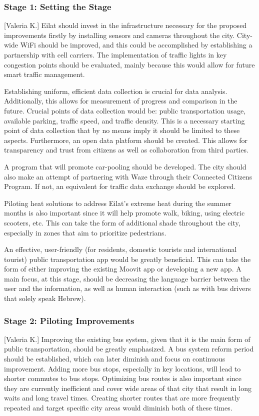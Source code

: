 \documentclass[12pt]{article}                               %
\begin{document}
\subsubsection{Stage 1: Setting the Stage}[Valeria K.]
Eilat should invest in the infrastructure necessary for the proposed improvements firstly by installing sensors and cameras throughout the city. City-wide WiFi should be improved, and this could be accomplished by establishing a partnership with cell carriers. The implementation of traffic lights in key congestion points should be evaluated, mainly because this would allow for future smart traffic management. 

Establishing uniform, efficient data collection is crucial for data analysis. Additionally, this allows for measurement of progress and comparison in the future. Crucial points of data collection would be: public transportation usage, available parking, traffic speed, and traffic density. This is a necessary starting point of data collection that by no means imply it should be limited to these aspects. Furthermore, an open data platform should be created. This allows for transparency and trust from citizens as well as collaboration from third parties. 

A program that will promote car-pooling should be developed. The city should also make an attempt of partnering with Waze through their Connected Citizens Program. If not, an equivalent for traffic data exchange should be explored.

Piloting heat solutions to address Eilat's extreme heat during the summer months is also important since it will help promote walk, biking, using electric scooters, etc. This can take the form of additional shade throughout the city, especially in zones that aim to prioritize pedestrians. 

An effective, user-friendly (for residents, domestic tourists and international tourist) public transportation app would be greatly beneficial. This can take the form of either improving the existing Moovit app or developing a new app. A main focus, at this stage, should be decreasing the language barrier between the user and the information, as well as human interaction (such as with bus drivers that solely speak Hebrew).

\subsubsection{Stage 2: Piloting Improvements}[Valeria K.]
Improving the existing bus system, given that it is the main form of public transportation, should be greatly emphasized. A bus system reform period should be established, which can later diminish and focus on continuous improvement. Adding more bus stops, especially in key locations, will lead to shorter commutes to bus stops. Optimizing bus routes is also important since they are currently inefficient and cover wide areas of that city that result in long waits and long travel times. Creating shorter routes that are more frequently repeated and target specific city areas would diminish both of these times. 
\end{document}
